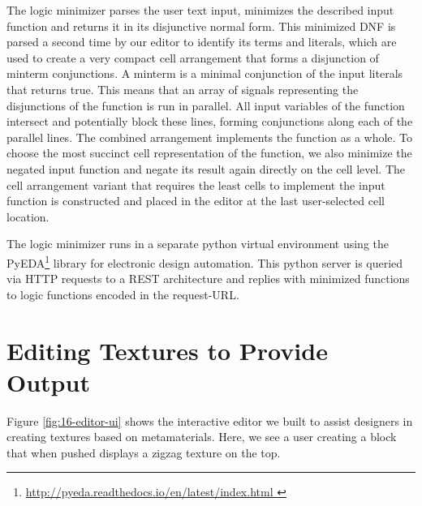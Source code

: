 The logic minimizer parses the user text input, minimizes the described input function and returns it in its disjunctive normal form. This minimized DNF is parsed a second time by our editor to identify its terms and literals, which are used to create a very compact cell arrangement that forms a disjunction of minterm conjunctions. A minterm is a minimal conjunction of the input literals that returns true. This means that an array of signals representing the disjunctions of the function is run in parallel. All input variables of the function intersect and potentially block these lines, forming conjunctions along each of the parallel lines. The combined arrangement implements the function as a whole. To choose the most succinct cell representation of the function, we also minimize the negated input function and negate its result again directly on the cell level. The cell arrangement variant that requires the least cells to implement the input function is constructed and placed in the editor at the last user-selected cell location.

The logic minimizer runs in a separate python virtual environment using the PyEDA\footnote{\url{http://pyeda.readthedocs.io/en/latest/index.html }} library for electronic design automation. This python server is queried via HTTP requests to a REST architecture and replies with minimized functions to logic functions encoded in the request-URL.














\section{Editing Textures to Provide Output}

Figure \ref{fig:16-editor-ui} shows the interactive editor we built to assist designers in creating textures based on metamaterials. Here, we see a user creating a block that when pushed displays a zigzag texture on the top. 

